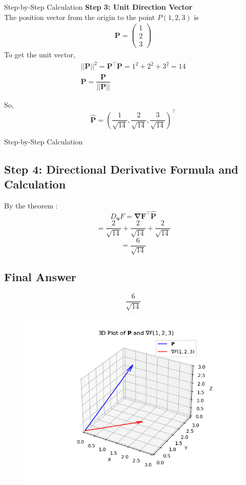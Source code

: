 \documentclass{beamer}
\let\vec\mathbf
\theoremstyle{remark}
\newcommand{\myvec}[1]{\ensuremath{\begin{pmatrix}#1\end{pmatrix}}}
\numberwithin{equation}{section}
\begin{document}
     \begin{frame}{ Step-by-Step Calculation}    
\textbf{Step 3: Unit Direction Vector}
\\
The position vector from the origin to the point \(P(1,2,3)\) is
\begin{align*}
    \vec{P}= \myvec{1\\2\\3}
\end{align*}
To get the unit vector,
\begin{align*}
||\vec{P}||^2 =\vec{P}^\top\vec{P}=1^2 + 2^2 + 3^2 = {14} 
\\
\vec{\hat{P}}=\dfrac{\vec{P}}{||\vec{P}||}
\end{align*}

So,
\[
\vec{\hat{P}} = \left(\frac{1}{\sqrt{14}}, \frac{2}{\sqrt{14}}, \frac{3}{\sqrt{14}}\right)^\top
\]

     \end{frame}
     \begin{frame}{ Step-by-Step Calculation}    
\subsection*{Step 4: Directional Derivative Formula and Calculation}

By the theorem :
\[
D_{\mathbf{u}} F = \vec{{\nabla F}}^\top  \vec{\hat{P}}
\]
\[
=  \frac{2}{\sqrt{14}} + \frac{2}{\sqrt{14}} +  \frac{2}{\sqrt{14}}
\]
\[
= \frac{6}{\sqrt{14}}
\]

\subsection*{Final Answer}
\[
\boxed{ \frac{6}{\sqrt{14}} }
\]
     \end{frame}
    
       \begin{frame}[fragile]
    \begin{figure}[H]
    \centering
    \includegraphics[width = 0.6\columnwidth]{../figs/img.png}
    \caption*{}
    \label{figs}
\end{figure}
\end{frame}
\end{document}
